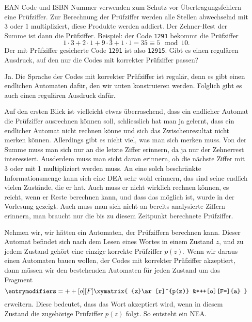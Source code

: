 EAN-Code und ISBN-Nummer verwenden zum Schutz vor Übertragungsfehlern
eine Prüfziffer. Zur Berechnung der Prüfziffer werden alle
Stellen abwechselnd mit 3 oder 1 multipliziert, diese Produkte werden
addiert. Der Zehner-Rest der Summe ist dann die Prüfziffer.
Beispiel: der Code {\tt 1291} bekommt die Prüfziffer
\[
1\cdot 3+2\cdot1+9\cdot3+1\cdot 1=35\equiv 5\mod10.
\]
Der mit Prüfziffer gesicherte Code {\tt 1291} ist also {\tt 12915}.
Gibt es einen regulären Ausdruck, auf den nur die Codes mit korrekter
Prüfziffer passen?


\begin{loesung}
Ja. Die Sprache der Codes mit korrekter Prüfziffer ist regulär,
denn es gibt einen endlichen Automaten dafür, den wir unten konstruieren
werden. Folglich gibt es auch einen regulären Ausdruck dafür.

Auf den ersten Blick ist vielleicht etwas überraschend, dass
ein endlicher Automat die Prüfziffer ausrechnen können soll,
schliesslich hat man ja gelernt, dass ein endlicher Automat
nicht rechnen könne und sich das Zwischenresultat nicht merken
können. Allerdings gibt es nicht viel, was man sich merken
muss. Von der Summe muss man sich nur an die letzte Ziffer
erinnern, da ja nur der Zehnerrest interessiert. Ausderdem
muss man sicht daran erinnern, ob die nächste Ziffer mit
3 oder mit 1 multipliziert werden muss. An eine solch beschränkte
Informationsmenge kann sich eine DEA sehr wohl erinnern, das sind
seine endlich vielen Zustände, die er hat. Auch muss er nicht
wirklich rechnen können, es reicht, wenn er Reste berechnen
kann, und dass das möglich ist, wurde in der Vorlesung gezeigt.
Auch muss man sich nicht an bereits analysierte Ziffern erinnern,
man braucht nur die bis zu diesem Zeitpunkt berechnete Prüfziffer.

Nehmen wir, wir hätten ein Automaten, der Prüfziffern
berechnen kann. Dieser Automat befindet sich nach dem Lesen eines
Wortes in einem Zustand $z$, und zu jedem Zustand gehört eine
einzige korrekte Prüfziffer $p(z)$. Wenn wir daraus einen
Automaten bauen wollen, der Codes mit korrekter Prüfziffer
akzeptiert, dann müssen wir den bestehenden Automaten für
jeden Zustand um das Fragment
\[
\entrymodifiers={++[o][F]}
\xymatrix{
{z}\ar[r]^{p(z)}
        &*++[o][F=]{a}
}
\]
erweitern.
Diese bedeutet, dass das Wort akzeptiert wird, wenn in diesem
Zustand die zugehörige Prüfziffer $p(z)$ folgt. So entsteht
ein NEA.


\end{loesung}
